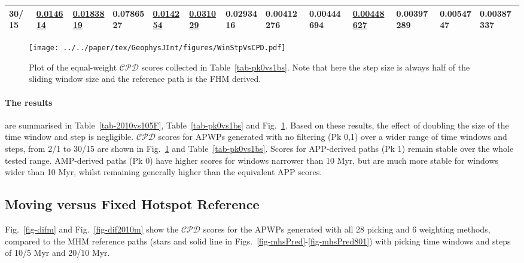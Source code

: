 \begin{landscape}
\begin{table}[]
{\begin{tabular}{@{}lllllllllllll@{}}
30/15 & {\color[HTML]{009901} {\ul\textbf{0.014614}}} & {\color[HTML]{009901} {\ul\textbf{0.0183819}}} & 0.0786527 & {\color[HTML]{009901} {\ul\textbf{0.014254}}} & {\color[HTML]{009901} {\ul\textbf{0.031029}}} & 0.0293416 & {\color[HTML]{34FF34} \textbf{0.00412276}} & 0.00444694 & {\color[HTML]{009901} {\ul\textbf{0.00448627}}} & {\color[HTML]{32CB00} \textbf{0.00397289}} & {\color[HTML]{32CB00} \textbf{0.0054747}} & {\color[HTML]{32CB00} \textbf{0.00387337}} \\ \bottomrule
\end{tabular}%
}
\end{table}
\end{landscape}

\begin{figure}[!ht]
\centering
\texttt{[image: ../../paper/tex/GeophysJInt/figures/WinStpVsCPD.pdf]}
\caption[Sliding window and step sizes vs $\mathcal{CPD}$]{Plot of the
equal-weight $\mathcal{CPD}$ scores collected in Table~\ref{tab-pk0vs1bs}. Note
that here the step size is always half of the sliding window size and the
reference path is the FHM derived.}\label{fig-WinStpVsCPD}
\end{figure}

\paragraph{The results}
are summarised in Table~\ref{tab-2010vs105F}, Table~\ref{tab-pk0vs1bs} and
Fig.~\ref{fig-WinStpVsCPD}. Based on these results, the effect of doubling the
size of the time window and step is negligible. $\mathcal{CPD}$ scores for APWPs
generated with no filtering (Pk 0,1) over a wider range of time windows and
steps, from 2/1 to 30/15 are shown in Fig.~\ref{fig-WinStpVsCPD} and
Table~\ref{tab-pk0vs1bs}. Scores for APP-derived paths (Pk 1) remain stable over
the whole tested range. AMP-derived paths (Pk 0) have higher scores for windows
narrower than 10 Myr, but are much more stable for windows wider than
10 Myr, whilst remaining generally higher than the equivalent APP
scores.


\subsection{Moving versus Fixed Hotspot Reference}

Fig.~\ref{fig-difm} and Fig.~\ref{fig-dif2010m} show the $\mathcal{CPD}$ scores
for the APWPs generated with all 28 picking and 6 weighting methods, compared to
the MHM reference paths (stars and solid line in Figs.~\ref{fig-mhsPred}-\ref{fig-mhsPred801})
with picking time windows and steps of 10/5 Myr and 20/10 Myr.

